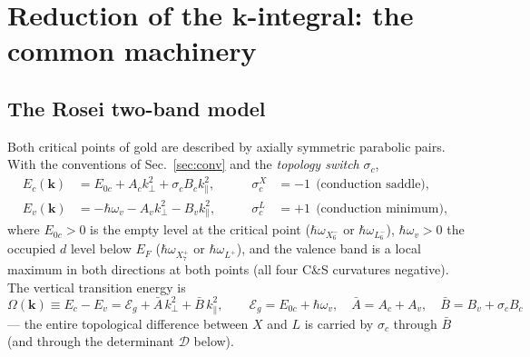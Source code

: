 \documentclass[11pt,a4paper]{article}
\numberwithin{equation}{section}
\newcommand{\Eg}{\mathcal{E}_g}
\newcommand{\cD}{\mathcal{D}}
\newcommand{\Ab}{\bar{A}}
\newcommand{\Bb}{\bar{B}}
\newcommand{\kperp}{k_{\perp}}
\newcommand{\kpar}{k_{\parallel}}
\newcommand{\Ec}{E_c}
\newcommand{\Ev}{E_v}
\newcommand{\Ezc}{E_{0c}}
\begin{document}
\section{Reduction of the $\mathbf{k}$-integral: the common machinery}
\label{sec:reduction}

\subsection{The Rosei two-band model}\label{sec:bands}

Both critical points of gold are described by axially symmetric
parabolic pairs.  With the conventions of Sec.~\ref{sec:conv} and the
\emph{topology switch} $\sigma_c$,
\begin{equation}
\boxed{\;
\begin{aligned}
\Ec(\mathbf k)&=\Ezc+A_c\kperp^{2}+\sigma_c B_c\kpar^{2},
&\qquad \sigma_c^{X}&=-1\ \ \text{(conduction saddle)},\\[2pt]
\Ev(\mathbf k)&=-\hbar\omega_v-A_v\kperp^{2}-B_v\kpar^{2},
&\qquad \sigma_c^{L}&=+1\ \ \text{(conduction minimum)},
\end{aligned}\;}
\label{eq:bands}
\end{equation}
where $\Ezc>0$ is the empty level at the critical point
($\hbar\omega_{X_6^-}$ or $\hbar\omega_{L_6^-}$), $\hbar\omega_v>0$
the occupied $d$ level below $E_F$
($\hbar\omega_{X_7^+}$ or $\hbar\omega_{L^+}$), and the valence band is
a local maximum in both directions at both points (all four C\&S
curvatures negative).  The vertical transition energy is
\begin{equation}
\Omega(\mathbf k)\equiv\Ec-\Ev
=\Eg+\Ab\,\kperp^{2}+\Bb\,\kpar^{2},
\qquad
\Eg=\Ezc+\hbar\omega_v,\quad
\Ab=A_c+A_v,\quad
\boxed{\Bb=B_v+\sigma_cB_c}
\label{eq:Omega}
\end{equation}
--- the entire topological difference between $X$ and $L$ is carried
by $\sigma_c$ through $\Bb$ (and through the determinant $\cD$ below).
\end{document}
